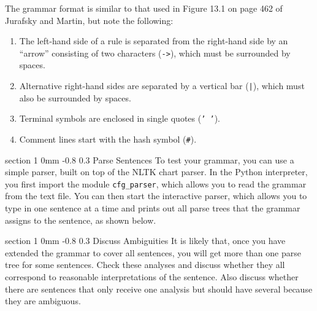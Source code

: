 \documentclass[10.9pt]{article}
\makeatletter
\newcommand{\newsec}[2]{\section{#1}\label{sec:#2}\noindent}
\renewcommand{\section}{\@startsection
{section}%
{1}%
{0mm}%
{-0.8\baselineskip}%
{0.3\baselineskip}%
{\bfseries\large}}%
\makeatother
\begin{document}
\begin{center}
\fbox{

}
\end{center}
The grammar format is similar to that used in Figure 13.1 on page 462 of Jurafsky and Martin, but note the following: %
\begin{enumerate}[noitemsep]
\item The left-hand side of a rule is separated from the right-hand side by an ``arrow'' consisting of two characters ({\tt ->}), which must be surrounded by spaces.
\item Alternative right-hand sides are separated by a vertical bar ({\tt |}), which must also be surrounded by spaces.
\item Terminal symbols are enclosed in single quotes ({\tt ' '}).
\item Comment lines start with the hash symbol ({\tt \#}).
\end{enumerate}

\newsec{Parse Sentences}{parse}%
To test your grammar, you can use a simple parser, built on top of the NLTK chart parser. In the Python interpreter, you first import the module {\tt cfg\_parser}, which allows you 
to read the grammar from the text file. You can then start the interactive parser, which allows you to type in one sentence at a time and prints out all parse trees that the grammar assigns to the sentence, as shown below.
\begin{center}
\fbox{

}
\end{center}

\newsec{Discuss Ambiguities}{parse}%
It is likely that, once you have extended the grammar to cover all sentences, you will get more than one parse tree for some sentences. Check these analyses and discuss whether they all correspond to reasonable interpretations of the sentence. Also discuss whether there are sentences that only receive one analysis but should have several because they are ambiguous.
\end{document}
